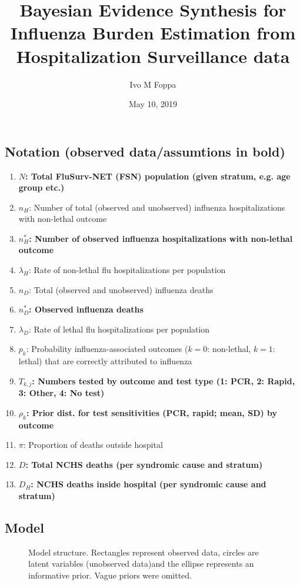 \documentclass{article}[12pt]
\title{Bayesian Evidence Synthesis for Influenza Burden Estimation from Hospitalization Surveillance data}
\author[1,2,*]{Ivo M Foppa}
\date{May 10, 2019}
\begin{document}
	{\let\newpage\relax\maketitle}	
	\maketitle%
	\subsection*{Notation (observed data/assumtions in \textbf{bold})} 
\begin{enumerate}
	\item\textbf{ $N$: Total FluSurv-NET (FSN) population (given stratum, e.g. age group etc.)}
\item $n_H$: Number of total (observed and unobserved) influenza hospitalizations with non-lethal outcome
\item \textbf{$n^\ast_{H}$: Number of observed influenza hospitalizations with non-lethal outcome}
\item $\lambda_H$: Rate of non-lethal flu hospitalizations per population
\item $n_D$: Total (observed and unobserved) influenza deaths
\item\textbf{ $n^\ast_D$: Observed influenza deaths}
\item $\lambda_D$: Rate of lethal flu hospitalizations per population
\item $p_{k}$: Probability influenza-associated outcomes ($k=0$: non-lethal, $k=1$: lethal) that are correctly attributed to influenza
\item\textbf{ $T_{k,j}$: Numbers tested by outcome and test type (1: PCR, 2: Rapid, 3: Other, 4: No test)}
\item \textbf{$\rho_{k}$: Prior dist. for test sensitivities (PCR, rapid; mean, SD) by outcome}
\item $\pi$: Proportion of deaths outside hospital
\item \textbf{$D$: Total NCHS deaths (per syndromic cause and stratum)}
\item \textbf{$D_H$: NCHS deaths inside hospital (per syndromic cause and stratum)}
\end{enumerate}
	\clearpage
	\subsection*{Model} 
%
\begin{figure}[h]
	\centering
	\resizebox{.5\textwidth}{!}{
		}
	\caption{Model structure. Rectangles represent observed data, circles are latent variables (unobserved data)and the ellipse represents an informative prior. Vague priors were omitted.}
	\label{fig2}
\end{figure}
%

\end{document}
